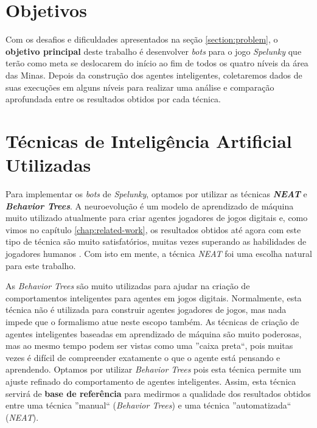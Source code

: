 \section{\label{section:objectives}Objetivos}
Com os desafios e dificuldades apresentados na seção \ref{section:problem}, o
\textbf{objetivo principal} deste trabalho é desenvolver \textit{bots} para o
jogo \textit{Spelunky} que terão como meta se deslocarem do início ao fim de
todos os quatro níveis da área das Minas. Depois da construção dos agentes
inteligentes, coletaremos dados de suas execuções em alguns níveis para realizar
uma análise e comparação aprofundada entre os resultados obtidos por cada
técnica.


\section{\label{section:techniques}Técnicas de Inteligência Artificial
Utilizadas}
Para implementar os \textit{bots} de \textit{Spelunky}, optamos por utilizar as
técnicas \textbf{\textit{NEAT}} e \textbf{\textit{Behavior Trees}}. A
neuroevolução é um modelo de aprendizado de máquina muito utilizado atualmente
para criar agentes jogadores de jogos digitais \cite{DBLP:journals/corr/RisiT14}
e, como vimos no capítulo \ref{chap:related-work}, os resultados obtidos até
agora com este tipo de técnica são muito satisfatórios, muitas vezes superando
as habilidades de jogadores humanos \cite{NeuroEvolutionAtari}. Com isto em
mente, a técnica \textit{NEAT} foi uma escolha natural para este trabalho.

As \textit{Behavior Trees} são muito utilizadas para ajudar na criação de
comportamentos inteligentes para agentes em jogos digitais. Normalmente, esta
técnica não é utilizada para construir agentes jogadores de jogos, mas nada
impede que o formalismo atue neste escopo também. As técnicas de criação de
agentes inteligentes baseadas em aprendizado de máquina são muito poderosas, mas
ao mesmo tempo podem ser vistas como uma ''caixa preta``, pois muitas vezes é
difícil de compreender exatamente o que o agente está pensando e aprendendo.
Optamos por utilizar \textit{Behavior Trees} pois esta técnica permite um ajuste
refinado do comportamento de agentes inteligentes. Assim, esta técnica servirá
de \textbf{base de referência} para medirmos a qualidade dos resultados obtidos
entre uma técnica ''manual`` (\textit{Behavior Trees}) e uma técnica
''automatizada`` (\textit{NEAT}).


